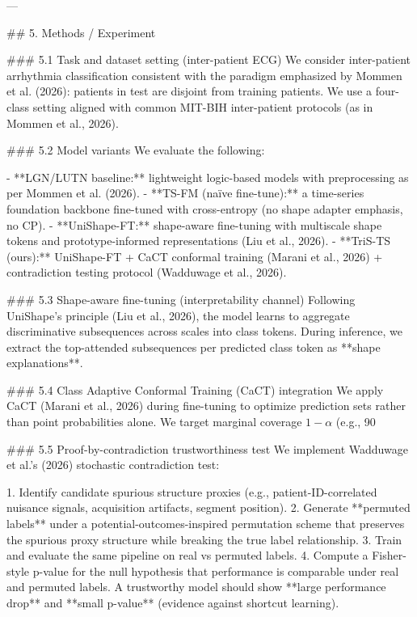 ---

## 5. Methods / Experiment  

### 5.1 Task and dataset setting (inter-patient ECG)  
We consider inter-patient arrhythmia classification consistent with the paradigm emphasized by Mommen et al. (2026): patients in test are disjoint from training patients. We use a four-class setting aligned with common MIT-BIH inter-patient protocols (as in Mommen et al., 2026).

### 5.2 Model variants  
We evaluate the following:

- **LGN/LUTN baseline:** lightweight logic-based models with preprocessing as per Mommen et al. (2026).  
- **TS-FM (naïve fine-tune):** a time-series foundation backbone fine-tuned with cross-entropy (no shape adapter emphasis, no CP).  
- **UniShape-FT:** shape-aware fine-tuning with multiscale shape tokens and prototype-informed representations (Liu et al., 2026).  
- **TriS-TS (ours):** UniShape-FT + CaCT conformal training (Marani et al., 2026) + contradiction testing protocol (Wadduwage et al., 2026).

### 5.3 Shape-aware fine-tuning (interpretability channel)  
Following UniShape’s principle (Liu et al., 2026), the model learns to aggregate discriminative subsequences across scales into class tokens. During inference, we extract the top-attended subsequences per predicted class token as **shape explanations**.

### 5.4 Class Adaptive Conformal Training (CaCT) integration  
We apply CaCT (Marani et al., 2026) during fine-tuning to optimize prediction sets rather than point probabilities alone. We target marginal coverage \(1-\alpha\) (e.g., 90%

### 5.5 Proof-by-contradiction trustworthiness test  
We implement Wadduwage et al.’s (2026) stochastic contradiction test:

1. Identify candidate spurious structure proxies (e.g., patient-ID-correlated nuisance signals, acquisition artifacts, segment position).  
2. Generate **permuted labels** under a potential-outcomes-inspired permutation scheme that preserves the spurious proxy structure while breaking the true label relationship.  
3. Train and evaluate the same pipeline on real vs permuted labels.  
4. Compute a Fisher-style p-value for the null hypothesis that performance is comparable under real and permuted labels. A trustworthy model should show **large performance drop** and **small p-value** (evidence against shortcut learning).

